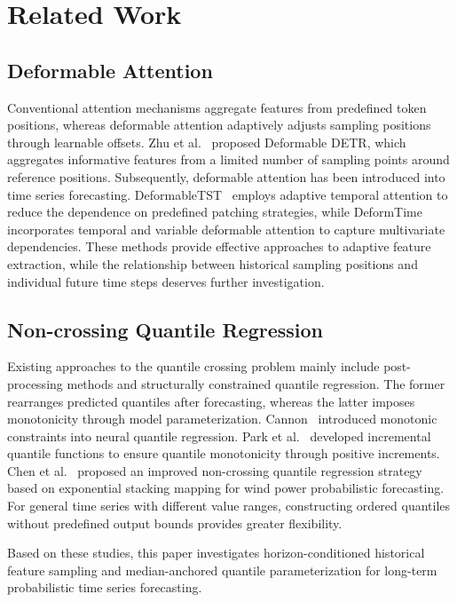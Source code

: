\section{Related Work}

\subsection{Deformable Attention}

Conventional attention mechanisms aggregate features from predefined token positions, whereas deformable attention adaptively adjusts sampling positions through learnable offsets. Zhu et al.~\cite{zhu2021deformable} proposed Deformable DETR, which aggregates informative features from a limited number of sampling points around reference positions. Subsequently, deformable attention has been introduced into time series forecasting. DeformableTST~\cite{deformabletst2024} employs adaptive temporal attention to reduce the dependence on predefined patching strategies, while DeformTime~\cite{shu2025deformtime} incorporates temporal and variable deformable attention to capture multivariate dependencies. These methods provide effective approaches to adaptive feature extraction, while the relationship between historical sampling positions and individual future time steps deserves further investigation.

\subsection{Non-crossing Quantile Regression}

Existing approaches to the quantile crossing problem mainly include post-processing methods and structurally constrained quantile regression. The former rearranges predicted quantiles after forecasting, whereas the latter imposes monotonicity through model parameterization. Cannon~\cite{cannon2018noncrossing} introduced monotonic constraints into neural quantile regression. Park et al.~\cite{park2022learning} developed incremental quantile functions to ensure quantile monotonicity through positive increments. Chen et al.~\cite{chen2025noncrossing} proposed an improved non-crossing quantile regression strategy based on exponential stacking mapping for wind power probabilistic forecasting. For general time series with different value ranges, constructing ordered quantiles without predefined output bounds provides greater flexibility.

Based on these studies, this paper investigates horizon-con\-di\-tioned historical feature sampling and median-anchored quantile parameterization for long-term probabilistic time series forecasting.